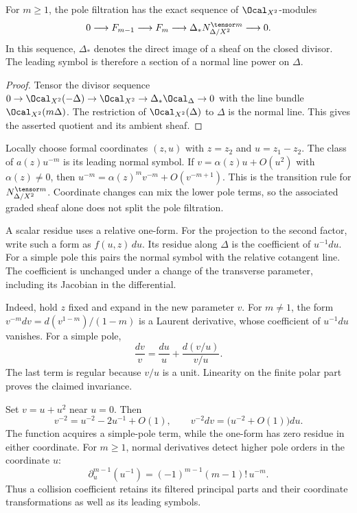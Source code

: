 \begin{proposition}
\label{cbc:loc:normal-symbol}
For $m\geq1$, the pole filtration has the exact sequence of
$\Ocal_{X^2}$-modules
\[
 0\longrightarrow F_{m-1}\longrightarrow F_m
 \longrightarrow\Delta_*N_{\Delta/X^2}^{\tensor m}
 \longrightarrow0.
\]
In this sequence, $\Delta_*$ denotes the direct image of a sheaf on the
closed divisor. The leading symbol is therefore a section of a normal
line power on $\Delta$.
\end{proposition}
\begin{proof}
Tensor the divisor sequence
$0\to\Ocal_{X^2}(-\Delta)\to\Ocal_{X^2}\to\Delta_*\Ocal_\Delta\to0$
with the line bundle $\Ocal_{X^2}(m\Delta)$.
The restriction of $\Ocal_{X^2}(\Delta)$ to $\Delta$ is the normal line.
This gives the asserted quotient and its ambient sheaf.
\end{proof}

Locally choose formal coordinates $(z,u)$ with $z=z_2$ and $u=z_1-z_2$.
The class of $a(z)u^{-m}$ is its leading normal symbol. If
$v=\alpha(z)u+O(u^2)$ with $\alpha(z)\ne0$, then
$u^{-m}=\alpha(z)^m v^{-m}+O(v^{-m+1})$. This is the transition rule
for $N_{\Delta/X^2}^{\tensor m}$. Coordinate changes can mix the lower
pole terms, so the associated graded sheaf alone does not split the
pole filtration.

A scalar residue uses a relative one-form. For the projection to the
second factor, write such a form as $f(u,z)\,du$. Its residue along
$\Delta$ is the coefficient of $u^{-1}du$. For a simple pole this pairs
the normal symbol with the relative cotangent line. The coefficient is
unchanged under a change of the transverse parameter, including its
Jacobian in the differential.

Indeed, hold $z$ fixed and expand in the new parameter $v$.
For $m\ne1$, the form $v^{-m}dv=d(v^{1-m})/(1-m)$ is a Laurent
derivative, whose coefficient of $u^{-1}du$ vanishes. For a simple pole,
\[
 \frac{dv}{v}=\frac{du}{u}+\frac{d(v/u)}{v/u}.
\]
The last term is regular because $v/u$ is a unit. Linearity on the
finite polar part proves the claimed invariance.

\begin{example}
\label{cbc:loc:residue}
Set $v=u+u^2$ near $u=0$. Then
\[
 v^{-2}=u^{-2}-2u^{-1}+O(1),\qquad
 v^{-2}dv=\bigl(u^{-2}+O(1)\bigr)du.
\]
The function acquires a simple-pole term, while the one-form has zero
residue in either coordinate. For $m\geq1$, normal derivatives detect
higher pole orders in the coordinate $u$:
\[
 \partial_u^{m-1}(u^{-1})=(-1)^{m-1}(m-1)!\,u^{-m}.
\]
Thus a collision coefficient retains its filtered principal parts and
their coordinate transformations as well as its leading symbols.
\end{example}

